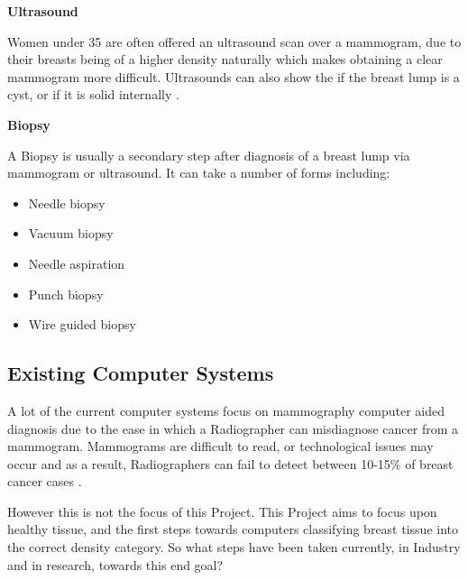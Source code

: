 \noindent \textbf{Ultrasound}

Women under 35 are often offered an ultrasound scan over a mammogram, due to their breasts being of a higher density naturally which makes obtaining a clear mammogram more difficult. Ultrasounds can also show the if the breast lump is a cyst, or if it is solid internally \cite{Cancer_Research_UK_2015}.

\noindent \textbf{Biopsy}

A Biopsy is usually a secondary step after diagnosis of a breast lump via mammogram or ultrasound. It can take a number of forms including:

\begin{itemize}
  \item Needle biopsy
  \item Vacuum biopsy
  \item Needle aspiration
  \item Punch biopsy
  \item Wire guided biopsy
\end{itemize}


\subsection{Existing Computer Systems}

A lot of the current computer systems focus on mammography computer aided diagnosis due to the ease in which a Radiographer can misdiagnose cancer from a mammogram. Mammograms are difficult to read, or technological issues may occur and as a result, Radiographers can fail to detect between 10-15\% of breast cancer cases \cite{Champaign_Cederbom_2000}.

However this is not the focus of this Project. This Project aims to focus upon healthy tissue, and the first steps towards computers classifying breast tissue into the correct density category. So what steps have been taken currently, in Industry and in research, towards this end goal?


